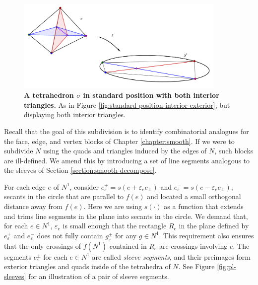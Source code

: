 \begin{figure}[h!]
	\centering
	\includegraphics[width=0.9\textwidth]{figures/standard-position-interior-interior.png}
	\caption{
		\textbf{A tetrahedron $\sigma$ in standard position with both interior triangles.}
		As in Figure \ref{fig:standard-position-interior-exterior}, but displaying both interior triangles.
	}
	\label{fig:standard-position-interior-interior}
\end{figure}

Recall that the goal of this subdivision is to identify combinatorial analogues for the face, edge, and vertex blocks of Chapter \ref{chapter:smooth}.
If we were to subdivide $N$ using the quads and triangles induced by the edges of $N$, such blocks are ill-defined.
We amend this by introducing a set of line segments analogous to the sleeves of Section \ref{section:smooth-decompose}.

For each edge $e$ of $N^1$, consider $e_\varepsilon^+ = s(e+\varepsilon_e e_\perp)$ and $e_\varepsilon^- =s(e-\varepsilon_e e_\perp)$, secants in the circle that are parallel to $f(e)$ and located a small orthogonal distance away from $f(e)$.
Here we are using $s(\cdot)$ as a function that extends and trims line segments in the plane into secants in the circle.
We demand that, for each $e\in N^1$, $\varepsilon_e$ is small enough that the rectangle $R_e$ in the plane defined by $e_\varepsilon^+$ and $e_\varepsilon^-$ does not fully contain $g_\varepsilon^\pm$ for any $g\in N^1$.
This requirement also ensures that the only crossings of $f(N^1)$ contained in $R_e$ are crossings involving $e$.
The segments $e_\varepsilon^\pm$ for each $e\in N^1$ are called \emph{sleeve segments}, and their preimages form exterior triangles and quads inside of the tetrahedra of $N$.
See Figure \ref{fig:pl-sleeves} for an illustration of a pair of sleeve segments.

